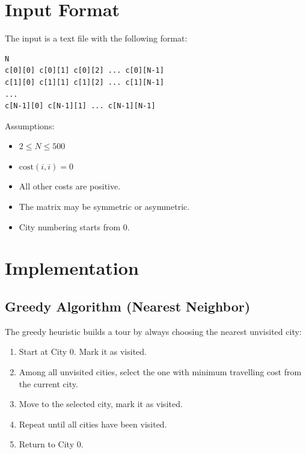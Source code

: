 \documentclass[12pt,a4paper]{article}
\begin{document}
\section{Input Format}

The input is a text file with the following format:
\begin{verbatim}
N
c[0][0] c[0][1] c[0][2] ... c[0][N-1]
c[1][0] c[1][1] c[1][2] ... c[1][N-1]
...
c[N-1][0] c[N-1][1] ... c[N-1][N-1]
\end{verbatim}

\noindent Assumptions:
\begin{itemize}
    \item $2 \leq N \leq 500$
    \item $\text{cost}(i, i) = 0$
    \item All other costs are positive.
    \item The matrix may be symmetric or asymmetric.
    \item City numbering starts from 0.
\end{itemize}

\section{Implementation}

\subsection{Greedy Algorithm (Nearest Neighbor)}

The greedy heuristic builds a tour by always choosing the nearest unvisited city:

\begin{enumerate}
    \item Start at City 0. Mark it as visited.
    \item Among all unvisited cities, select the one with minimum travelling cost from the current city.
    \item Move to the selected city, mark it as visited.
    \item Repeat until all cities have been visited.
    \item Return to City 0.
\end{enumerate}
\end{document}
